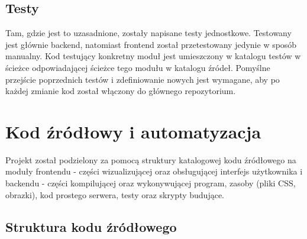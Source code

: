 \documentclass[a4paper,twoside,openright,11pt]{report}
\begin{document}
  \section{Testy}
\par Tam, gdzie jest to uzasadnione, zostały napisane testy jednostkowe. Testowany jest głównie backend, natomiast frontend został przetestowany jedynie w sposób manualny.  Kod testujący konkretny moduł jest umieszczony w katalogu testów w ścieżce odpowiadającej ścieżce tego modułu w katalogu źródeł. Pomyślne przejście poprzednich testów i zdefiniowanie nowych jest wymagane, aby po każdej zmianie kod został włączony do głównego repozytorium.

  \chapter {Kod źródłowy i automatyzacja}
\par Projekt został podzielony za pomocą struktury katalogowej kodu źródłowego na moduły frontendu - części wizualizującej oraz obsługującej interfejs użytkownika i backendu - części kompilującej oraz wykonywującej program, zasoby (pliki CSS, obrazki), kod prostego serwera, testy oraz skrypty budujące. 

  \section{Struktura kodu źródłowego}
\end{document}
